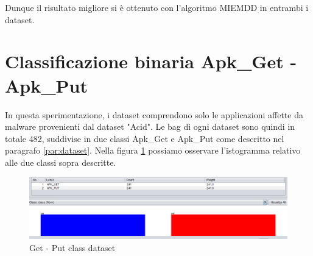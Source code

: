 Dunque il risultato migliore si è ottenuto con l'algoritmo MIEMDD in entrambi i dataset. 

\section{Classificazione binaria Apk\_Get - Apk\_Put}
In questa sperimentazione, i dataset comprendono solo le applicazioni affette da malware provenienti dal dataset "Acid". Le bag di ogni dataset sono quindi in totale 482, suddivise in due classi Apk\_Get e Apk\_Put come descritto nel paragrafo \ref{par:dataset}. 
Nella figura \ref{fig:getputclassdataset} possiamo osservare l'istogramma relativo alle due classi sopra descritte. 
\begin{figure}[h]
\centering
    \includegraphics[width=0.9\linewidth]{imgs/capitolo5/multicalsse/getputclass.png} 
    \caption{Get - Put class dataset}
    \label{fig:getputclassdataset}
\end{figure}
\FloatBarrier

